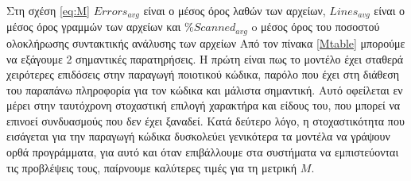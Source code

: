 Στη σχέση \ref{eq:M} $Errors_{avg}$ είναι ο μέσος όρος λαθών των αρχείων, $Lines_{avg}$ είναι ο μέσος όρος γραμμών των αρχείων και $\%Scanned_{avg}$ o μέσος όρος του ποσοστού ολοκλήρωσης συντακτικής ανάλυσης των αρχείων Από τον πίνακα \ref{Mtable} μπορούμε να εξάγουμε 2 σημαντικές παρατηρήσεις.
Η πρώτη είναι πως το μοντέλο  έχει σταθερά χειρότερες επιδόσεις στην παραγωγή ποιοτικού κώδικα, παρόλο που έχει στη διάθεση του παραπάνω πληροφορία για τον κώδικα και μάλιστα σημαντική. Αυτό οφείλεται εν μέρει στην ταυτόχρονη στοχαστική επιλογή χαρακτήρα και είδους του, που μπορεί να επινοεί συνδυασμούς που δεν έχει ξαναδεί. Κατά δεύτερο λόγο, η στοχαστικότητα που εισάγεται για την παραγωγή κώδικα δυσκολεύει γενικότερα τα μοντέλα να γράψουν ορθά προγράμματα, για αυτό και όταν επιβάλλουμε στα συστήματα να εμπιστεύονται τις προβλέψεις τους, παίρνουμε καλύτερες τιμές για τη μετρική $M$.